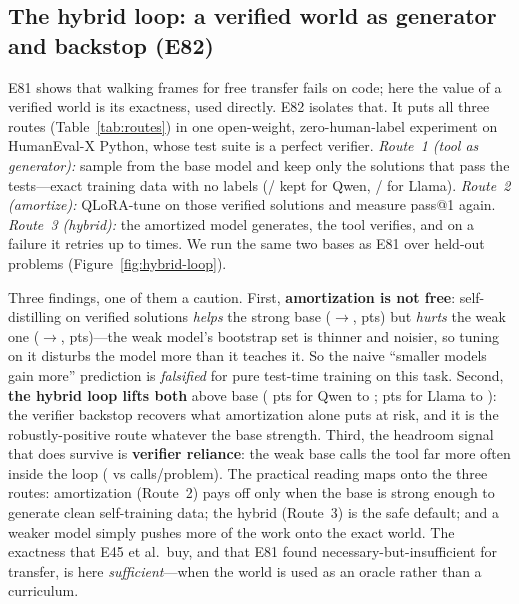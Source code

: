 \documentclass[11pt]{article}
\begin{document}
\subsection{The hybrid loop: a verified world as generator and backstop (E82)}\label{sec:hybrid-loop}
E81 shows that walking frames for free transfer fails on code; here the value of a verified world
is its exactness, used directly. E82 isolates that. It puts all three routes
(Table~\ref{tab:routes}) in one open-weight, zero-human-label experiment on HumanEval-X Python, whose
test suite is a perfect verifier. \emph{Route~1 (tool as generator):} sample from the base model and
keep only the solutions that pass the tests---exact training data with no labels (\HybridQwenPairs/\HybridNTrain{}
kept for Qwen, \HybridLlamaPairs/\HybridNTrain{} for Llama). \emph{Route~2 (amortize):} QLoRA-tune on
those verified solutions and measure pass@1 again. \emph{Route~3 (hybrid):} the amortized model
generates, the tool verifies, and on a failure it retries up to \HybridRetry{} times. We run the same
two bases as E81 over \HybridNEval{} held-out problems (Figure~\ref{fig:hybrid-loop}).

Three findings, one of them a caution. First, \textbf{amortization is not free}: self-distilling on
verified solutions \emph{helps} the strong base (\HybridQwenBase{}$\to$\HybridQwenAmort{},
\HybridQwenAmortDelta{} pts) but \emph{hurts} the weak one (\HybridLlamaBase{}$\to$\HybridLlamaAmort{},
\HybridLlamaAmortDelta{} pts)---the weak model's bootstrap set is thinner and noisier, so tuning on
it disturbs the model more than it teaches it. So the naive ``smaller models gain more'' prediction is
\emph{falsified} for pure test-time training on this task. Second, \textbf{the hybrid loop lifts
both} above base (\HybridQwenHybridDelta{} pts for Qwen to \HybridQwenHybrid{};
\HybridLlamaHybridDelta{} pts for Llama to \HybridLlamaHybrid{}): the verifier backstop recovers what
amortization alone puts at risk, and it is the robustly-positive route whatever the base strength. Third, the
headroom signal that does survive is \textbf{verifier reliance}: the weak base calls the tool
far more often inside the loop (\HybridLlamaCalls{} vs \HybridQwenCalls{} calls/problem). The
practical reading maps onto the three routes: amortization (Route~2) pays off only when the base is
strong enough to generate clean self-training data; the hybrid (Route~3) is the safe default; and a
weaker model simply pushes more of the work onto the exact world. The exactness that E45 et al.\ buy,
and that E81 found necessary-but-insufficient for transfer, is here \emph{sufficient}---when the world
is used as an oracle rather than a curriculum.
\end{document}
